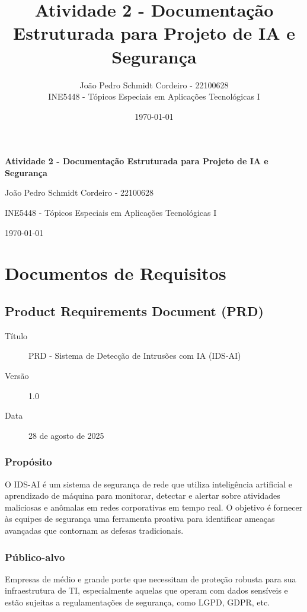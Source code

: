 \documentclass[a4paper,12pt]{article}
\title{Atividade 2 - Documentação Estruturada para
Projeto de IA e Segurança}
\author{João Pedro Schmidt Cordeiro - 22100628 \\ INE5448 - Tópicos Especiais em Aplicações Tecnológicas I}
\date{\today}
\begin{document}
\begin{titlepage}
    \centering
    {\Huge\bfseries Atividade 2 - Documentação Estruturada para Projeto de IA e Segurança\par}
    {\Large João Pedro Schmidt Cordeiro - 22100628\par}
    {\large INE5448 - Tópicos Especiais em Aplicações Tecnológicas I\par}
    {\today\par}
    \vfill
\end{titlepage}

\tableofcontents
\newpage

\section{Documentos de Requisitos}

\subsection{Product Requirements Document (PRD)}

\begin{description}
    \item[Título] PRD - Sistema de Detecção de Intrusões com IA (IDS-AI)
    \item[Versão] 1.0
    \item[Data] 28 de agosto de 2025
\end{description}

\subsubsection{Propósito}
O IDS-AI é um sistema de segurança de rede que utiliza inteligência artificial e aprendizado de máquina para monitorar, detectar e alertar sobre atividades maliciosas e anômalas em redes corporativas em tempo real. O objetivo é fornecer às equipes de segurança uma ferramenta proativa para identificar ameaças avançadas que contornam as defesas tradicionais.

\subsubsection{Público-alvo}
Empresas de médio e grande porte que necessitam de proteção robusta para sua infraestrutura de TI, especialmente aquelas que operam com dados sensíveis e estão sujeitas a regulamentações de segurança, como LGPD, GDPR, etc.
\end{document}
